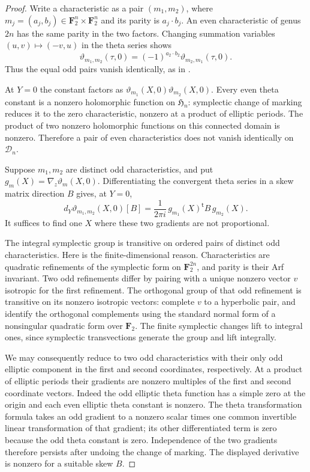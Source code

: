 \begin{proof}
Write a characteristic as a pair $(m_1,m_2)$, where
$m_j=(a_j,b_j)\in\mathbf F_2^n\times\mathbf F_2^n$ and its parity is
$a_j\cdot b_j$. An even characteristic of genus $2n$ has the same
parity in the two factors. Changing summation variables
$(u,v)\mapsto(-v,u)$ in the theta series shows
\[
 \vartheta_{m_1,m_2}(\tau,0)
   =(-1)^{a_2\cdot b_2}\vartheta_{m_2,m_1}(\tau,0).
\]
Thus the equal odd pairs vanish identically, as in
\cite[Lemma~2.3]{vG96}.

At $Y=0$ the constant factors as
$\vartheta_{m_1}(X,0)\vartheta_{m_2}(X,0)$.
Every even theta constant is a nonzero holomorphic function on
$\mathfrak H_n$: symplectic change of marking reduces it to the
zero characteristic, nonzero at a product of elliptic periods.
The product of two nonzero holomorphic functions on this connected
domain is nonzero. Therefore a pair of even characteristics does
not vanish identically on $\mathcal D_n$.

Suppose $m_1,m_2$ are distinct odd characteristics, and put
$g_m(X)=\nabla_z\vartheta_m(X,0)$.
Differentiating the convergent theta series in a skew matrix
direction $B$ gives, at $Y=0$,
\[
 d_Y\vartheta_{m_1,m_2}(X,0)[B]
   =\frac{1}{2\pi i}\,g_{m_1}(X)^{\mathsf t}B\,g_{m_2}(X).
\]
It suffices to find one $X$ where these two gradients are not
proportional.

The integral symplectic group is transitive on ordered pairs of
distinct odd characteristics. Here is the finite-dimensional reason.
Characteristics are quadratic refinements of the symplectic form
on $\mathbf F_2^{2n}$, and parity is their Arf invariant.
Two odd refinements differ by pairing with a unique nonzero vector
$v$ isotropic for the first refinement. The orthogonal group of
that odd refinement is transitive on its nonzero isotropic vectors:
complete $v$ to a hyperbolic pair, and identify the orthogonal
complements using the standard normal form of a nonsingular
quadratic form over $\mathbf F_2$. The finite symplectic changes
lift to integral ones, since symplectic transvections generate
the group and lift integrally.

We may consequently reduce to two odd characteristics with their
only odd elliptic component in the first and second coordinates,
respectively. At a product of elliptic periods their gradients
are nonzero multiples of the first and second coordinate vectors.
Indeed the odd elliptic theta function has a simple zero at the
origin and each even elliptic theta constant is nonzero.
The theta transformation formula takes an odd gradient to a
nonzero scalar times one common invertible linear transformation
of that gradient; its other differentiated term is zero because
the odd theta constant is zero. Independence of the two gradients
therefore persists after undoing the change of marking.
The displayed derivative is nonzero for a suitable skew $B$.


\end{proof}
